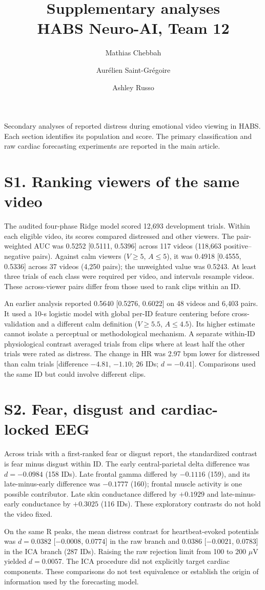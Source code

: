 \documentclass[10pt]{article}
\title{Supplementary analyses\\\large HABS Neuro-AI, Team 12}
\author{Mathias Chebbah \and Aurélien Saint-Grégoire \and Ashley Russo}
\date{}
\begin{document}
\maketitle
Secondary analyses of reported distress during emotional video viewing in HABS. Each section identifies its population and score. The primary classification and raw cardiac forecasting experiments are reported in the main article.
\section*{S1. Ranking viewers of the same video}
The audited four-phase Ridge model scored 12,693 development trials. Within each eligible video, its scores compared distressed and other viewers. The pair-weighted AUC was 0.5252 [0.5111, 0.5396] across 117 videos (118,663 positive--negative pairs). Against calm viewers ($V\ge5$, $A\le5$), it was 0.4918 [0.4555, 0.5336] across 37 videos (4,250 pairs); the unweighted value was 0.5243. At least three trials of each class were required per video, and intervals resample videos. These across-viewer pairs differ from those used to rank clips within an ID.

An earlier analysis reported 0.5640 [0.5276, 0.6022] on 48 videos and 6,403 pairs. It used a 10-s logistic model with global per-ID feature centering before cross-validation and a different calm definition ($V\ge5.5$, $A\le4.5$). Its higher estimate cannot isolate a perceptual or methodological mechanism. A separate within-ID physiological contrast averaged trials from clips where at least half the other trials were rated as distress. The change in HR was 2.97 bpm lower for distressed than calm trials [difference $-4.81$, $-1.10$; 26 IDs; $d=-0.41$]. Comparisons used the same ID but could involve different clips.
\section*{S2. Fear, disgust and cardiac-locked EEG}
Across trials with a first-ranked fear or disgust report, the standardized contrast is fear minus disgust within ID. The early central-parietal delta difference was $d=-0.0984$ (158 IDs). Late frontal gamma differed by $-0.1116$ (159), and its late-minus-early difference was $-0.1777$ (160); frontal muscle activity is one possible contributor. Late skin conductance differed by $+0.1929$ and late-minus-early conductance by $+0.3025$ (116 IDs). These exploratory contrasts do not hold the video fixed.

On the same R peaks, the mean distress contrast for heartbeat-evoked potentials was $d=0.0382$ [$-0.0008$, $0.0774$] in the raw branch and $0.0386$ [$-0.0021$, $0.0783$] in the ICA branch (287 IDs). Raising the raw rejection limit from 100 to 200 $\mu$V yielded $d=0.0057$. The ICA procedure did not explicitly target cardiac components. These comparisons do not test equivalence or establish the origin of information used by the forecasting model.
\end{document}
